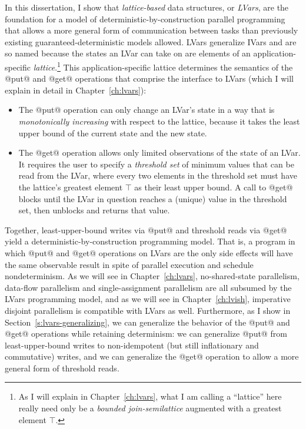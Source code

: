 In this dissertation, I show that \emph{lattice-based} data
structures, or \emph{LVars}, are the foundation for a model of
deterministic-by-construction parallel programming that allows a more
general form of communication between tasks than previously existing
guaranteed-deterministic models allowed.  LVars generalize IVars and
are so named because the states an LVar can take on are elements of an
application-specific \emph{lattice}.\footnote{As I will explain in
  Chapter~\ref{ch:lvars}, what I am calling a ``lattice'' here really
  need only be a \emph{bounded join-semilattice} augmented with a
  greatest element $\top$.}  This application-specific lattice
determines the semantics of the @put@ and @get@ operations that
comprise the interface to LVars (which I will explain in detail in
Chapter~\ref{ch:lvars}):
\begin{itemize}
\item The @put@ operation can only change an LVar's state in a way
  that is \emph{monotonically increasing} with respect to the lattice,
  because it takes the least upper bound of the current state and the
  new state.
\item The @get@ operation allows only limited observations of the
  state of an LVar.  It requires the user to specify a \emph{threshold
    set} of minimum values that can be read from the LVar, where every
  two elements in the threshold set must have the lattice's greatest
  element $\top$ as their least upper bound.  A call to @get@ blocks until the
  LVar in question reaches a (unique) value in the threshold set, then
  unblocks and returns that value.
\end{itemize}
Together, least-upper-bound writes via @put@ and threshold reads via
@get@ yield a deterministic-by-construction programming model.  That
is, a program in which @put@ and @get@ operations on LVars are the
only side effects will have the same observable result in spite of
parallel execution and schedule nondeterminism.   As we will see in
Chapter~\ref{ch:lvars}, no-shared-state parallelism, data-flow
parallelism and single-assignment parallelism are all subsumed by the
LVars programming model, and as we will see in
Chapter~\ref{ch:lvish},
imperative disjoint parallelism is compatible with LVars as well.
Furthermore, as I show in Section~\ref{s:lvars-generalizing}, we can
generalize the behavior of the @put@ and @get@ operations while
retaining determinism: we can generalize @put@ from least-upper-bound
writes to non-idempotent (but still inflationary and commutative)
writes, and we can generalize the @get@ operation to allow a more
general form of threshold reads.

